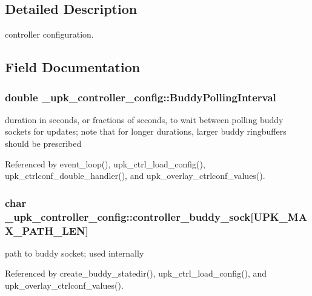 \subsection{Detailed Description}
controller configuration. 

\subsection{Field Documentation}
\subsubsection[{BuddyPollingInterval}]{\setlength{\rightskip}{0pt plus 5cm}double {\bf \_\-upk\_\-controller\_\-config::BuddyPollingInterval}}\label{struct__upk__controller__config_ae7689d54900beb4a7a07839bca6e044e}
duration in seconds, or fractions of seconds, to wait between polling buddy sockets for updates; note that for longer durations, larger buddy ringbuffers should be prescribed 

Referenced by event\_\-loop(), upk\_\-ctrl\_\-load\_\-config(), upk\_\-ctrlconf\_\-double\_\-handler(), and upk\_\-overlay\_\-ctrlconf\_\-values().

\subsubsection[{controller\_\-buddy\_\-sock}]{\setlength{\rightskip}{0pt plus 5cm}char {\bf \_\-upk\_\-controller\_\-config::controller\_\-buddy\_\-sock}[UPK\_\-MAX\_\-PATH\_\-LEN]}\label{struct__upk__controller__config_adff47b2ee40217837feb28913d51299e}
path to buddy socket; used internally 

Referenced by create\_\-buddy\_\-statedir(), upk\_\-ctrl\_\-load\_\-config(), and upk\_\-overlay\_\-ctrlconf\_\-values().

